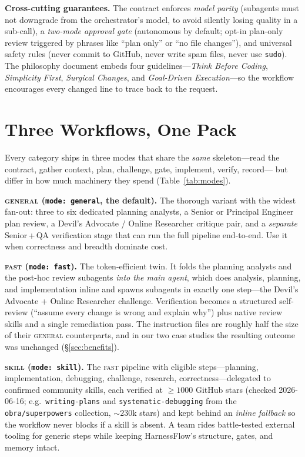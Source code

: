 \documentclass{article}
\begin{document}
\textbf{Cross-cutting guarantees.} The contract enforces \emph{model parity}
(subagents must not downgrade from the orchestrator's model, to avoid silently
losing quality in a sub-call), a \emph{two-mode approval gate} (autonomous by
default; opt-in plan-only review triggered by phrases like ``plan only'' or ``no
file changes''), and universal safety rules (never commit to GitHub, never write
spam files, never use \texttt{sudo}). The philosophy document embeds four
guidelines---\emph{Think Before Coding}, \emph{Simplicity First}, \emph{Surgical
Changes}, and \emph{Goal-Driven Execution}---so the workflow encourages every
changed line to trace back to the request.

\section{Three Workflows, One Pack}
\label{sec:modes}

Every category ships in three modes that share the \emph{same} skeleton---read
the contract, gather context, plan, challenge, gate, implement, verify, record---
but differ in how much machinery they spend (Table~\ref{tab:modes}).

\textbf{\textsc{general} (\texttt{mode: general}, the default).} The thorough
variant with the widest fan-out: three to six dedicated planning analysts, a
Senior or Principal Engineer plan review, a Devil's Advocate / Online Researcher
critique pair, and a \emph{separate} Senior\,+\,QA verification stage that can run
the full pipeline end-to-end. Use it when correctness and breadth dominate cost.

\textbf{\textsc{fast} (\texttt{mode: fast}).} The token-efficient twin. It folds
the planning analysts and the post-hoc review subagents \emph{into the main
agent}, which does analysis, planning, and implementation inline and spawns
subagents in exactly one step---the Devil's Advocate + Online Researcher
challenge. Verification becomes a structured self-review (``assume every change
is wrong and explain why'') plus native review skills and a single remediation
pass. The instruction files are roughly half the size of their \textsc{general}
counterparts, and in our two case studies the resulting outcome was unchanged
(\S\ref{sec:benefits}).

\textbf{\textsc{skill} (\texttt{mode: skill}).} The \textsc{fast} pipeline with
eligible steps---planning, implementation, debugging, challenge, research,
correctness---delegated to confirmed community skills, each verified at
$\geq\!1000$ GitHub stars (checked 2026-06-16; e.g.\ \texttt{writing-plans} and
\texttt{systematic-debugging} from the \texttt{obra/superpowers} collection,
${\sim}230\mathrm{k}$ stars) and kept behind an \emph{inline fallback} so the
workflow never blocks
if a skill is absent. A team rides battle-tested external tooling for generic
steps while keeping HarnessFlow's structure, gates, and memory intact.
\end{document}
